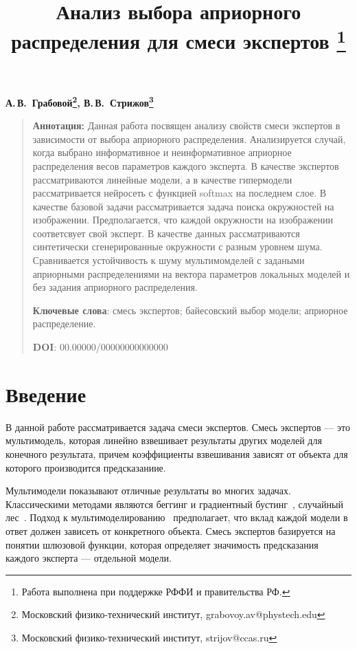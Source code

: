 \documentclass[12pt, twoside]{article}
\numberwithin{equation}{section}
\begin{document}
\title{\bf Анализ выбора априорного распределения для смеси экспертов \thanks{Работа выполнена при поддержке РФФИ и правительства РФ.}}
\date{}
\author{}
\maketitle

\begin{center}
\bf
А.\,В.~Грабовой\footnote{Московский физико-технический институт, grabovoy.av@phystech.edu}, В.\,В.~Стрижов\footnote{Московский физико-технический институт, strijov@ccas.ru}

\end{center}

{\centering\begin{quote}
\textbf{Аннотация:} 
Данная работа посвящен анализу свойств смеси экспертов в зависимости от выбора априорного распределения. Анализируется случай, когда выбрано информативное и неинформативное априорное распределения весов параметров каждого эксперта. В качестве экспертов рассматриваются линейные модели, а в качестве гипермодели рассматривается нейросеть с функцией softmax на последнем слое. В качестве базовой задачи рассматривается задача поиска окружностей на изображении. Предполагается, что каждой окружности на изображении соответсвует свой эксперт. В качестве данных рассматриваются синтетически сгенерированные окружности с разным уровнем шума. Сравнивается устойчивость к шуму мультимомделей с задаными априорными распределениями на вектора параметров локальных моделей и без задания априорного распределения.

\smallskip
\textbf{Ключевые слова}: смесь экспертов; байесовский выбор модели; априорное распределение.

\smallskip
\textbf{DOI}: 00.00000/00000000000000
\end{quote}
}

\section{Введение}
В данной работе рассматривается задача смеси экспертов. Смесь экспертов --- это мультимодель, которая линейно взвешивает результаты других моделей для конечного результата, причем коэффициенты взвешивания зависят от объекта для которого производится предсказаниие.

Мультимодели показывают отличные результаты во многих задачах. Классическими методами являются беггинг и градиентный бустинг~\cite{Tianqi2016}, случайный лес~\cite{Ishwaran2012}. Подход к мультимоделированию~\cite{Yuksel2012} предполагает, что вклад каждой модели в ответ должен зависеть от конкретного объекта. Смесь экспертов базируется на понятии шлюзовой функции, которая определяет значимость предсказания каждого эксперта --- отдельной модели.
\end{document}
